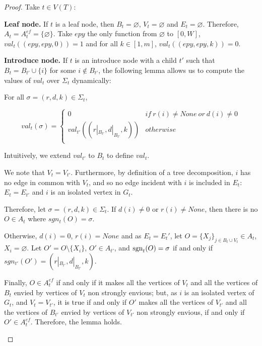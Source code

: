 \begin{proof}
    Take $t\in V(T)$:

    \textbf{Leaf node.} If $t$ is a leaf node, then $B_t=\varnothing$, $V_t=\varnothing$ and $E_t=\varnothing$. Therefore, $A_t=A_t^{ef}=\{\varnothing\}$. Take $epy$ the only function from $\varnothing$ to $[0,W]$, $val_t((epy,epy,0))=1$ and for all $k\in [1,m]$, $val_t((epy,epy,k))=0$.

    \textbf{Introduce node.} If $t$ is an introduce node with a child $t'$ such that $B_t=B_{t'}\cup \{i\}$ for some $i\notin B_{t'}$, the following lemma allows us to compute the values of $val_t$ over $\Sigma_t$ dynamically:

    \begin{lemma}
        For all $\sigma = (r,d,k)\in \Sigma_t$,

        \[val_t(\sigma)=\begin{cases}
            0 & if\ r(i)\neq None\ or\ d(i)\neq 0 \\
            val_{t'}((r|_{B_{t'}},d|_{B_{t'}},k)) & otherwise\\
        \end{cases}\]
    \end{lemma}

    Intuitively, we extend $val_{t'}$ to $B_t$ to define $val_t$.

    \begin{nestedproof}
        We note that $V_t=V_{t'}$. Furthermore, by definition of a tree decomposition, $i$ has no edge in common with $V_t$, and so no edge incident with $i$ is included in $E_t$: $E_t=E_{t'}$ and $i$ is an isolated vertex in $G_t$.

        Therefore, let $\sigma=(r,d,k)\in \Sigma_t$. If $d(i)\neq 0$ or $r(i)\neq None$, then there is no $O\in A_t$ where $sgn_t(O)=\sigma$.

        Otherwise, $d(i)=0$, $r(i)=None$ and as $E_t=E_t'$, let $O=\{X_j\}_{j\in B_t\cup V_t}\in A_t$, $X_i=\varnothing$. Let $O'=O\setminus\{X_i\}$, $O'\in A_{t'}$, and $\operatorname{sgn}_t(O)=\sigma$ if and only if $sgn_{t'}(O')=(r|_{B_{t'}},d|_{B_{t'}},k)$.

        Finally, $O\in A_t^{ef}$ if and only if it makes all the vertices of $V_t$ and all the vertices of $B_t$ envied by vertices of $V_t$ non strongly envious; but, as $i$ is an isolated vertex of $G_t$, and $V_t=V_{t'}$, it is true if and only if $O'$ makes all the vertices of $V_{t'}$ and all the vertices of $B_{t'}$ envied by vertices of $V_{t'}$ non strongly envious, if and only if $O'\in A_t^{ef}$. Therefore, the lemma holds.
    \end{nestedproof}


\end{proof}
